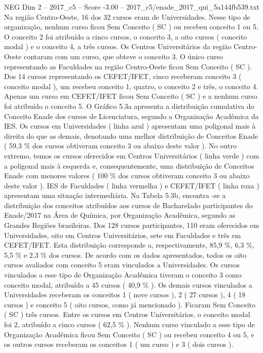 \begin{textsample}{NEG Dim 2 – 2017\_c5 – Score -3.00 – 2017\_c5/enade\_2017\_qui\_5a144fb539.txt}
Na região Centro-Oeste, 16 dos 32 cursos eram de Universidades.
Nesse tipo de organização, nenhum curso ficou Sem Conceito ( SC ) ou recebeu conceito 1 ou 5.
O conceito 2 foi atribuído a cinco cursos, o conceito 3, a oito cursos ( conceito modal ) e o conceito 4, a três cursos.
Os Centros Universitários da região Centro-Oeste contaram com um curso, que obteve o conceito 3.
O único curso representando as Faculdades na região Centro-Oeste ficou Sem Conceito ( SC ).
Dos 14 cursos representando os CEFET/IFET, cinco receberam conceito 3 ( conceito modal ), um recebeu conceito 1, quatro, o conceito 2 e três, o conceito 4.
Apenas um curso em CEFET/IFET ficou Sem Conceito ( SC ) e a nenhum curso foi atribuído o conceito 5.
O Gráfico 5.3a apresenta a distribuição cumulativa do Conceito Enade dos cursos de Licenciatura, segundo a Organização Acadêmica da IES.
Os cursos em Universidades ( linha azul ) apresentam uma poligonal mais à direita do que as demais, denotando uma melhor distribuição de Conceitos Enade ( 59,3 \% dos cursos obtiveram conceito 3 ou abaixo deste valor ).
No outro extremo, temos os cursos oferecidos em Centros Universitários ( linha verde ) com a poligonal mais à esquerda e, consequentemente, uma distribuição de Conceitos Enade com menores valores ( 100 \% dos cursos obtiveram conceito 3 ou abaixo deste valor ).
IES de Faculdades ( linha vermelha ) e CEFET/IFET ( linha roxa ) apresentam uma situação intermediária.
Na Tabela 5.3b, encontra -se a distribuição dos conceitos atribuídos aos cursos de Bacharelado participantes do Enade/2017 na Área de Química, por Organização Acadêmica, segundo as Grandes Regiões brasileiras.
Dos 128 cursos participantes, 110 eram oferecidos em Universidades, oito em Centros Universitários, sete em Faculdades e três em CEFET/IFET.
Esta distribuição corresponde a, respectivamente, 85,9 \%, 6,3 \%, 5,5 \% e 2,3 \% dos cursos.
De acordo com os dados apresentados, todos os oito cursos avaliados com conceito 5 eram vinculados a Universidades.
Os cursos vinculados a esse tipo de Organização Acadêmica tiveram o conceito 3 como conceito modal, atribuído a 45 cursos ( 40,9 \% ).
Os demais cursos vinculados a Universidades receberam os conceitos 1 ( nove cursos ), 2 ( 27 cursos ), 4 ( 18 cursos ) e conceito 5 ( oito cursos, como já mencionado ).
Ficaram Sem Conceito ( SC ) três cursos.
Entre os cursos em Centros Universitários, o conceito modal foi 2, atribuído a cinco cursos ( 62,5 \% ).
Nenhum curso vinculado a esse tipo de Organização Acadêmica ficou Sem Conceito ( SC ) ou recebeu conceito 4 ou 5, e os outros cursos receberam os conceitos 1 ( um curso ) e 3 ( dois cursos ).

\end{textsample}
